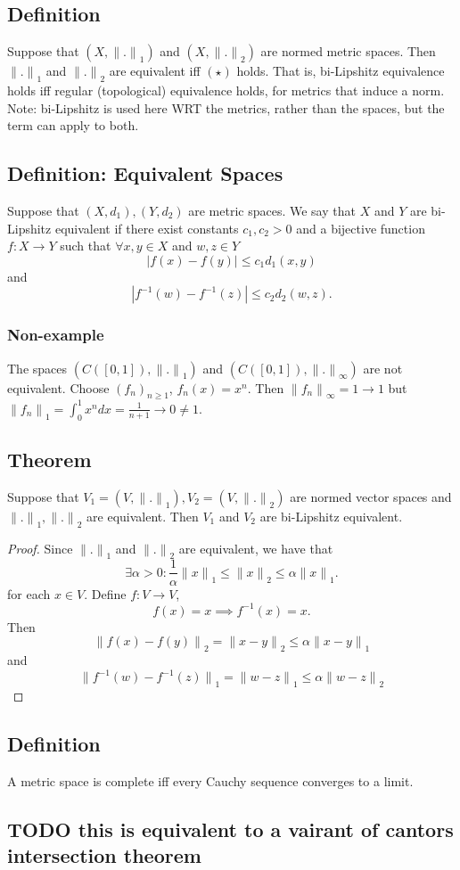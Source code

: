 \documentclass{article}
\newcommand{\fseq}{(f_n)_{n \geq 1}}
\newcommand{\norm}{{\|.\|}}
\begin{document}
\subsection*{Definition}
Suppose that $(X,{\|.\|}_1)$ and $(X,{\|.\|}_2)$ are normed metric spaces.
Then ${\|.\|}_1$ and ${\|.\|}_2$ are equivalent iff $(\star)$ holds.
That is, bi-Lipshitz equivalence holds iff regular
(topological) equivalence holds,
for metrics that induce a norm. Note: bi-Lipshitz is used here WRT the metrics, rather than the spaces, but the term can apply to both.
\subsection*{Definition: Equivalent Spaces}
Suppose that $(X,d_1),(Y,d_2)$ are metric spaces.
We say that $X$ and $Y$ are
bi-Lipshitz equivalent if there exist constants
$c_1,c_2 > 0$ and a bijective function $f: X \to Y$ such that
$\forall x,y \in X$ and $w,z \in Y$$$
|f(x)-f(y)| \leq c_1 d_1(x,y)
$$
and $$
|f^{-1}(w)-f^{-1}(z)| \leq c_2 d_2(w,z).
$$
\subsubsection*{Non-example}
The spaces $(C([0,1]),\norm_1)$ and $(C([0,1]),\norm_{\infty})$ are not equivalent.
Choose $\fseq$, $f_n(x) = x^n$. Then ${\|f_n\|}_{\infty} = 1 \to 1$ but ${\|f_n\|}_1 = \int_0^1 x^n dx = \frac{1}{n+1} \to 0 \neq 1$.
\subsection*{Theorem}
Suppose that $V_1 = (V,\norm_1), V_2 = (V,\norm_2)$
are normed vector spaces and $\norm_1,\norm_2$ are equivalent.
Then $V_1$ and $V_2$ are bi-Lipshitz equivalent.
\begin{proof}
Since $\norm_1$ and $\norm_2$ are equivalent,
we have that
$$
\exists \alpha > 0: \frac{1}{\alpha} {\|x\|}_1 \leq {\|x\|}_2 \leq \alpha {\|x\|}_1.
$$
for each $x \in V$. Define $f:V \to V$,
$$
f(x) = x \implies f^{-1}(x) =
x.
$$
Then $$
{\|f(x)-f(y)\|}_2 = {\|x-y\|}_2 \leq \alpha {\|x-y\|}_1
$$
and
$$
{\|f^{-1}(w)-f^{-1}(z)\|}_1 = {\|w-z\|}_1 \leq \alpha {\|w-z\|}_2
$$
\end{proof}
\subsection*{Definition}
A metric space is complete iff every Cauchy sequence converges to a limit.
\subsection*{TODO this is equivalent to a vairant of cantors intersection theorem}
\end{document}
